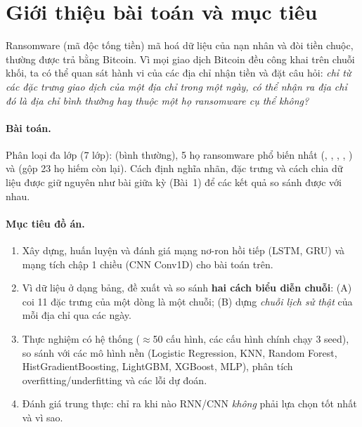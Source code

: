 \section{Giới thiệu bài toán và mục tiêu}

Ransomware (mã độc tống tiền) mã hoá dữ liệu của nạn nhân và đòi tiền chuộc, thường được trả bằng Bitcoin. Vì mọi giao dịch Bitcoin
đều công khai trên chuỗi khối, ta có thể quan sát hành vi của các địa chỉ nhận tiền và đặt câu hỏi: \emph{chỉ từ các đặc trưng giao dịch
của một địa chỉ trong một ngày, có thể nhận ra địa chỉ đó là địa chỉ bình thường hay thuộc một họ ransomware cụ thể không?}

{\sloppy\paragraph{Bài toán.} Phân loại đa lớp (7 lớp):  (bình thường), 5 họ ransomware phổ biến nhất
(, , , , )
và  (gộp 23 họ hiếm còn lại). Cách định nghĩa nhãn, đặc trưng và cách chia dữ liệu được giữ nguyên như bài giữa kỳ
(Bài~1) để các kết quả so sánh được với nhau.\par}

\paragraph{Mục tiêu đồ án.}
\begin{enumerate}
\item Xây dựng, huấn luyện và đánh giá mạng nơ-ron hồi tiếp (LSTM, GRU) và mạng tích chập 1 chiều (CNN Conv1D) cho bài toán trên.
\item Vì dữ liệu ở dạng bảng, đề xuất và so sánh \textbf{hai cách biểu diễn chuỗi}:
  (A) coi 11 đặc trưng của một dòng là một chuỗi;
  (B) dựng \emph{chuỗi lịch sử thật} của mỗi địa chỉ qua các ngày.
\item Thực nghiệm có hệ thống ($\approx$50 cấu hình, các cấu hình chính chạy 3 seed), so sánh với các mô hình nền (Logistic Regression, KNN, Random Forest,
  HistGradientBoosting, LightGBM, XGBoost, MLP), phân tích overfitting/underfitting và các lỗi dự đoán.
\item Đánh giá trung thực: chỉ ra khi nào RNN/CNN \emph{không} phải lựa chọn tốt nhất và vì sao.
\end{enumerate}
